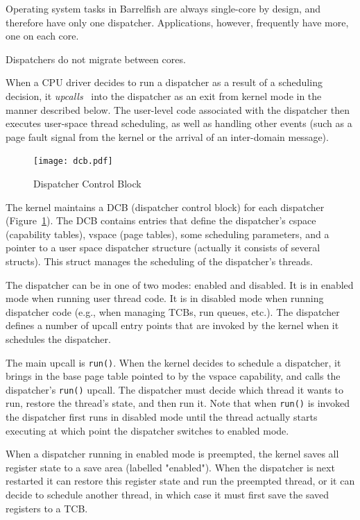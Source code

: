 \documentclass[a4paper,twoside]{report} %
\begin{document}
Operating system tasks in Barrelfish are always single-core by design,
and therefore have only one dispatcher.  Applications, however,
frequently have more, one on each core. 

Dispatchers do not migrate between cores. 

When a CPU driver decides to run a dispatcher as a result of a
scheduling decision, it
\emph{upcalls}~\cite{Clark:1985:SSU:323647.323645} into the dispatcher
as an exit from kernel mode in the manner described below.  The
user-level code associated with the dispatcher then executes
user-space thread scheduling, as well as handling other events (such
as a page fault signal from the kernel or the arrival of an
inter-domain message). 

\begin{figure}[hbt]
 \begin{center}
 \texttt{[image: dcb.pdf]}
 \end{center}
 \caption{Dispatcher Control Block}\label{fig:dcb}
\end{figure}

The kernel maintains a DCB (dispatcher control block) for each dispatcher
(Figure~\ref{fig:dcb}). The DCB contains entries that define the dispatcher's
cspace (capability tables), vspace (page tables), some scheduling parameters,
and a pointer to a user space dispatcher structure (actually it consists of
several structs). This struct manages the scheduling of the dispatcher's
threads.

The dispatcher can be in one of two modes: enabled and disabled. It is in
enabled mode when running user thread code. It is in disabled mode when running
dispatcher code (e.g., when managing TCBs, run queues, etc.). The dispatcher
defines a number of upcall entry points that are invoked by the kernel when it
schedules the dispatcher.

The main upcall is \texttt{run()}.  When the kernel decides to schedule a
dispatcher, it brings in the base page table pointed to by the vspace
capability, and calls the dispatcher's \texttt{run()} upcall.  The dispatcher
must decide which thread it wants to run, restore the thread's state, and then
run it. Note that when \texttt{run()} is invoked the dispatcher first runs in
disabled mode until the thread actually starts executing at which point the
dispatcher switches to enabled mode.

When a dispatcher running in enabled mode is preempted, the kernel saves all
register state to a save area (labelled "enabled"). When the dispatcher is next
restarted it can restore this register state and run the preempted thread, or it
can decide to schedule another thread, in which case it must first save the
saved registers to a TCB.  
\end{document}

